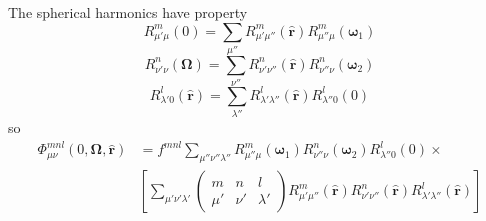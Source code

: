The spherical harmonics have property \citep{Edmonds,Messiah}
\begin{equation}
R_{\mu'\mu}^{m}(0)=\sum_{\mu''}R_{\mu'\mu''}^{m}(\mathbf{\hat{r}})R_{\mu''\mu}^{m}(\boldsymbol{\omega}_{1})
\end{equation}
\begin{equation}
R_{\nu'\nu}^{n}(\mathbf{\Omega})=\sum_{\nu''}R_{\nu'\nu''}^{n}(\mathbf{\hat{r}})R_{\nu''\nu}^{n}(\boldsymbol{\omega}_{2})
\end{equation}
\begin{equation}
R_{\lambda'0}^{l}(\mathbf{\hat{r}})=\sum_{\lambda''}R_{\lambda'\lambda''}^{l}(\mathbf{\hat{r}})R_{\lambda''0}^{l}(0)
\end{equation}
so
\begin{align}
\Phi_{\mu\nu}^{mnl}(0,\mathbf{\Omega},\mathbf{\hat{r}}) & =f^{mnl}\sum_{\mu''\nu''\lambda''}R_{\mu''\mu}^{m}(\boldsymbol{\omega}_{1})R_{\nu''\nu}^{n}(\boldsymbol{\omega}_{2})R_{\lambda''0}^{l}(0)\times\nonumber \\
 & \left[\sum_{\mu'\nu'\lambda'}\left(\begin{array}{ccc}
m & n & l\\
\mu' & \nu' & \lambda'
\end{array}\right)R_{\mu'\mu''}^{m}(\mathbf{\hat{r}})R_{\nu'\nu''}^{n}(\mathbf{\hat{r}})R_{\lambda'\lambda''}^{l}(\mathbf{\hat{r}})\right]
\end{align}

